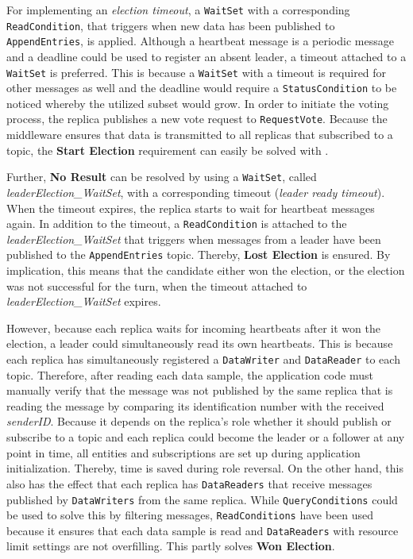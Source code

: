 For implementing an \textit{election timeout}, a \texttt{WaitSet} with a corresponding \texttt{ReadCondition}, that triggers when new data has been published to \texttt{AppendEntries}, is applied.
Although a heartbeat message is a periodic message and a deadline  could be used to register an absent leader, a timeout attached to a \texttt{WaitSet} is preferred.
This is because a \texttt{WaitSet} with a timeout is required for other messages as well and the deadline  would require a \texttt{StatusCondition} to be noticed whereby the utilized  subset would grow.
In order to initiate the voting process, the replica publishes a new vote request to \texttt{RequestVote}.
Because the middleware ensures that data is transmitted to all replicas that subscribed to a topic, the \textbf{Start Election} requirement can easily be solved with .

Further, \textbf{No Result} can be resolved by using a \texttt{WaitSet}, called \textit{leaderElection\_WaitSet}, with a corresponding timeout (\textit{leader ready timeout}).
When the timeout expires, the replica starts to wait for heartbeat messages again.
In addition to the timeout, a \texttt{ReadCondition} is attached to the \textit{leaderElection\_WaitSet} that triggers when messages from a leader have been published to the \texttt{AppendEntries} topic.
Thereby, \textbf{Lost Election} is ensured.
By implication, this means that the candidate either won the election, or the election was not successful for the turn, when the timeout attached to \textit{leaderElection\_WaitSet} expires.

However, because each replica waits for incoming heartbeats after it won the election, a leader could simultaneously read its own heartbeats.
This is because each replica has simultaneously registered a \texttt{DataWriter} and \texttt{DataReader} to each topic.
Therefore, after reading each data sample, the application code must manually verify that the message was not published by the same replica that is reading the message by comparing its identification number with the received \textit{senderID}.
Because it depends on the replica's role whether it should publish or subscribe to a topic and each replica could become the leader or a follower at any point in time, all  entities and subscriptions are set up during application initialization.
Thereby, time is saved during role reversal.
On the other hand, this also has the effect that each replica has \texttt{DataReaders} that receive messages published by \texttt{DataWriters} from the same replica.
While \texttt{QueryConditions} could be used to solve this by filtering messages, \texttt{ReadConditions} have been used because it ensures that each data sample is read and \texttt{DataReaders} with resource limit  settings are not overfilling.
This partly solves \textbf{Won Election}.

